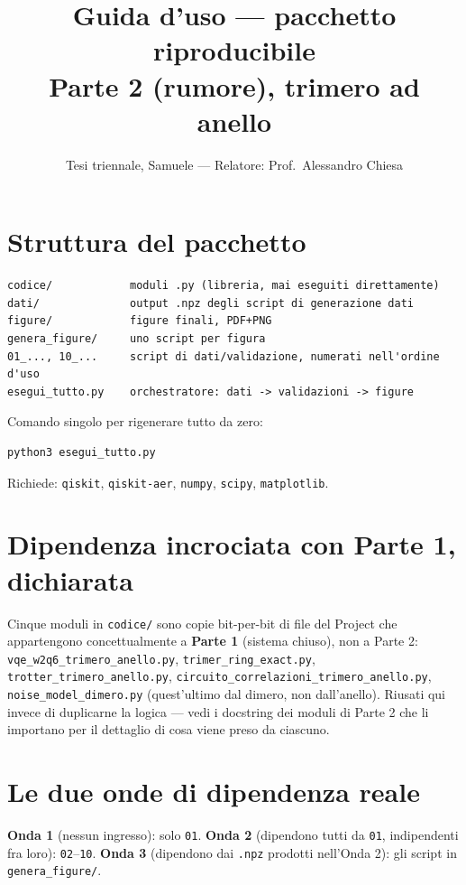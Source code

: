 \documentclass[11pt,a4paper]{article}
\title{Guida d'uso --- pacchetto riproducibile\\Parte 2 (rumore), trimero ad anello}
\author{Tesi triennale, Samuele --- Relatore: Prof.\ Alessandro Chiesa}
\date{}
\begin{document}
\sloppy
\maketitle

\tableofcontents

\section{Struttura del pacchetto}

\begin{verbatim}
codice/            moduli .py (libreria, mai eseguiti direttamente)
dati/              output .npz degli script di generazione dati
figure/            figure finali, PDF+PNG
genera_figure/     uno script per figura
01_..., 10_...     script di dati/validazione, numerati nell'ordine d'uso
esegui_tutto.py    orchestratore: dati -> validazioni -> figure
\end{verbatim}

Comando singolo per rigenerare tutto da zero:
\begin{verbatim}
python3 esegui_tutto.py
\end{verbatim}
Richiede: \texttt{qiskit}, \texttt{qiskit-aer}, \texttt{numpy}, \texttt{scipy}, \texttt{matplotlib}.

\section{Dipendenza incrociata con Parte 1, dichiarata}

Cinque moduli in \texttt{codice/} sono copie bit-per-bit di file del
Project che appartengono concettualmente a \textbf{Parte 1} (sistema
chiuso), non a Parte 2: \texttt{vqe\_w2q6\_\allowbreak trimero\_anello.py},
\texttt{trimer\_ring\_exact.py}, \texttt{trotter\_\allowbreak trimero\_anello.py},
\texttt{circuito\_\allowbreak correlazioni\_\allowbreak trimero\_anello.py},
\texttt{noise\_model\_dimero.py} (quest'ultimo dal dimero, non
dall'anello). Riusati qui invece di duplicarne la logica --- vedi i
docstring dei moduli di Parte 2 che li importano per il dettaglio di
cosa viene preso da ciascuno.

\section{Le due onde di dipendenza reale}

\textbf{Onda 1} (nessun ingresso): solo \texttt{01}. \textbf{Onda 2}
(dipendono tutti da \texttt{01}, indipendenti fra loro):
\texttt{02}--\texttt{10}. \textbf{Onda 3} (dipendono dai \texttt{.npz}
prodotti nell'Onda 2): gli script in \texttt{genera\_figure/}.
\end{document}
